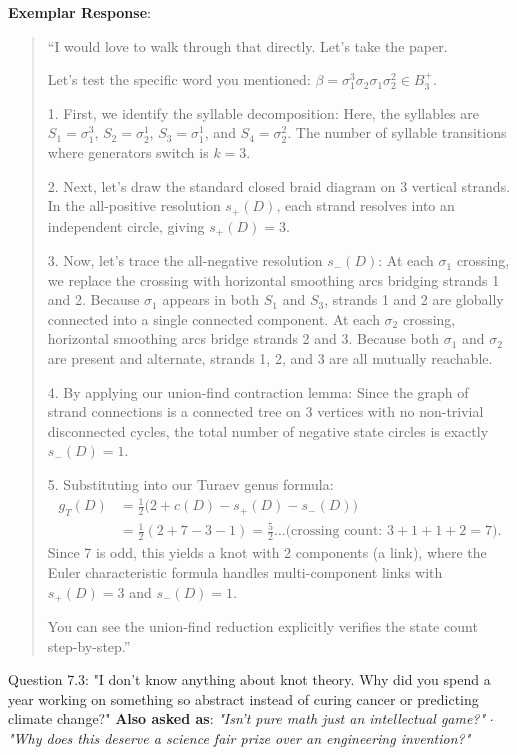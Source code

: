 \documentclass[11pt,letterpaper]{article}
\begin{document}
\begin{exemplarbox}
\textbf{Exemplar Response}:
\begin{quote}
``I would love to walk through that directly. Let's take the paper.

Let's test the specific word you mentioned: $\beta = \sigma_1^3 \sigma_2 \sigma_1 \sigma_2^2 \in B_3^+$. 

1. First, we identify the syllable decomposition:
Here, the syllables are $S_1 = \sigma_1^3$, $S_2 = \sigma_2^1$, $S_3 = \sigma_1^1$, and $S_4 = \sigma_2^2$. The number of syllable transitions where generators switch is $k=3$.

2. Next, let's draw the standard closed braid diagram on 3 vertical strands. In the all-positive resolution $s_+(D)$, each strand resolves into an independent circle, giving $s_+(D) = 3$.

3. Now, let's trace the all-negative resolution $s_-(D)$:
At each $\sigma_1$ crossing, we replace the crossing with horizontal smoothing arcs bridging strands 1 and 2. Because $\sigma_1$ appears in both $S_1$ and $S_3$, strands 1 and 2 are globally connected into a single connected component.
At each $\sigma_2$ crossing, horizontal smoothing arcs bridge strands 2 and 3. Because both $\sigma_1$ and $\sigma_2$ are present and alternate, strands 1, 2, and 3 are all mutually reachable. 

4. By applying our union-find contraction lemma:
Since the graph of strand connections is a connected tree on 3 vertices with no non-trivial disconnected cycles, the total number of negative state circles is exactly $s_-(D) = 1$.

5. Substituting into our Turaev genus formula:
\begin{align*}
g_T(D) &= \frac{1}{2}\big(2 + c(D) - s_+(D) - s_-(D)\big) \\
&= \frac{1}{2}(2 + 7 - 3 - 1) = \frac{5}{2} \dots \text{(crossing count: } 3+1+1+2 = 7\text{).}
\end{align*}
Since 7 is odd, this yields a knot with 2 components (a link), where the Euler characteristic formula handles multi-component links with $s_+(D) = 3$ and $s_-(D) = 1$. 

You can see the union-find reduction explicitly verifies the state count step-by-step.''
\end{quote}
\end{exemplarbox}

\vspace{1em}

\begin{questionbox}{Question 7.3: "I don't know anything about knot theory. Why did you spend a year working on something so abstract instead of curing cancer or predicting climate change?"}
\textbf{Also asked as}: \textit{"Isn't pure math just an intellectual game?"} $\cdot$ \textit{"Why does this deserve a science fair prize over an engineering invention?"}
\end{questionbox}
\end{document}

